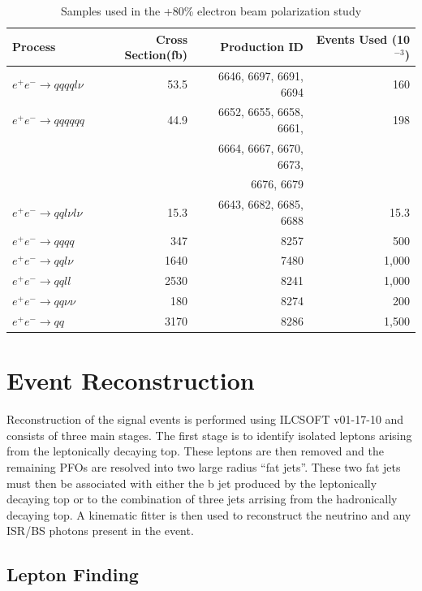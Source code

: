 \begin{table}
  \centering
  \begin{tabular}{l | r | r |r}
    \toprule
    Process     & Cross Section(fb) & Production ID & Events Used (10$^{-3}$) \\
    \midrule
    $e^+e^-\rightarrow qqqql\nu$ & 53.5 & 6646, 6697, 6691, 6694 & 160 \\
    \midrule
    $e^+e^-\rightarrow qqqqqq$ & 44.9 & 6652, 6655, 6658, 6661, & 198 \\
     &  & 6664, 6667, 6670, 6673, &  \\
     &  & 6676, 6679 &  \\
    \midrule
    $e^+e^-\rightarrow qql\nu l\nu$ & 15.3  & 6643, 6682, 6685, 6688 & 15.3 \\
    \midrule
    $e^+e^-\rightarrow qqqq$ & 347 & 8257 & 500 \\
    \midrule
    $e^+e^-\rightarrow qql\nu$ & 1640 & 7480 & 1,000 \\
    \midrule
    $e^+e^-\rightarrow qqll$ & 2530 & 8241 & 1,000 \\
    \midrule
    $e^+e^-\rightarrow qq\nu\nu$ & 180 & 8274 & 200 \\
    \midrule
    $e^+e^-\rightarrow qq$ & 3170 & 8286 & 1,500 \\
    \bottomrule
  \end{tabular}
  \caption{Samples used in the +80\% electron beam polarization study}
  \label{table:topsamplespospol}
\end{table}


\section{Event Reconstruction}
Reconstruction of the signal events is performed using ILCSOFT v01-17-10 and consists of three main stages. The first stage is to identify isolated leptons arising from the leptonically decaying top. These leptons are then removed and the remaining PFOs are resolved into two large radius ``fat jets''. These two fat jets must then be associated with either the b jet produced by the leptonically decaying top or to the combination of three jets arrising from the hadronically decaying top. A kinematic fitter is then used to reconstruct the neutrino and any \ac{ISR}/\ac{BS} photons present in the event.

\subsection{Lepton Finding}

